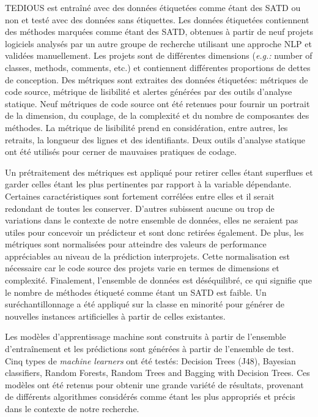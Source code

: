 \ac{TEDIOUS} est entra\^{i}n\'{e} avec des donn\'{e}es \'{e}tiquet\'{e}es comme \'{e}tant des \ac{SATD} ou non et test\'{e} avec des donn\'{e}es sans \'{e}tiquettes. Les donn\'{e}es \'{e}tiquet\'{e}es contiennent des m\'{e}thodes marqu\'{e}es comme \'{e}tant des \ac{SATD}, obtenues \`{a} partir de neuf projets logiciels analys\'{e}s par un autre groupe de recherche utilisant une approche \ac{NLP} et valid\'{e}es manuellement. Les projets sont de diff\'{e}rentes dimensions (\emph{e.g.:} number of classes, methods, comments, etc.) et contiennent diff\'{e}rentes proportions de dettes de conception. Des m\'{e}triques sont extraites des donn\'{e}es \'{e}tiquet\'{e}es: m\'{e}triques de code source, m\'{e}trique  de lisibilit\'{e} et alertes g\'{e}n\'{e}r\'{e}es par des outils d'analyse statique. Neuf m\'{e}triques de code source ont \'{e}t\'{e} retenues pour fournir un portrait de la dimension, du couplage, de la complexit\'{e} et du nombre de composantes des m\'{e}thodes. La m\'{e}trique de lisibilit\'{e} prend en consid\'{e}ration, entre autres, les retraits, la longueur des lignes et des identifiants. Deux outils d'analyse statique ont \'{e}t\'{e} utilis\'{e}s pour cerner de mauvaises pratiques de codage. \par

Un pr\'{e}traitement des m\'{e}triques est appliqu\'{e} pour retirer celles \'{e}tant superflues et garder celles \'{e}tant les plus pertinentes par rapport \`{a} la variable d\'{e}pendante. Certaines caract\'{e}ristiques sont fortement corr\'{e}l\'{e}es entre elles et il serait redondant de toutes les conserver. D'autres subissent aucune ou trop de variations dans le contexte de notre ensemble de donn\'{e}es, elles ne seraient pas utiles pour concevoir un pr\'{e}dicteur et sont donc retir\'{e}es \'{e}galement. De plus, les m\'{e}triques sont normalis\'{e}es pour atteindre des valeurs de performance appr\'{e}ciables au niveau de la pr\'{e}diction interprojets. Cette normalisation est n\'{e}cessaire car le code source des projets varie en termes de dimensions et complexit\'{e}. Finalement, l'ensemble de donn\'{e}es est d\'{e}s\'{e}quilibr\'{e}, ce qui signifie que le nombre de m\'{e}thodes \'{e}tiquet\'{e} comme \'{e}tant un \ac{SATD} est faible. Un sur\'{e}chantillonnage a \'{e}t\'{e} appliqu\'{e} sur la classe en minorit\'{e} pour g\'{e}n\'{e}rer de nouvelles instances artificielles \`{a} partir de celles existantes. \par

Les mod\`{e}les d'apprentissage machine sont construits \`{a} partir de l'ensemble d'entra\^{i}nement et les pr\'{e}dictions sont g\'{e}n\'{e}r\'{e}es \`{a} partir de l'ensemble de test. Cinq types de \emph{machine learners} ont \'{e}t\'{e} test\'{e}s: Decision Trees (J48), Bayesian classifiers, Random Forests, Random Trees and Bagging with Decision Trees. Ces mod\`{e}les ont \'{e}t\'{e} retenus pour obtenir une grande vari\'{e}t\'{e} de r\'{e}sultats, provenant de diff\'{e}rents algorithmes consid\'{e}r\'{e}s comme \'{e}tant les plus appropri\'{e}s et pr\'{e}cis dans le contexte de notre recherche. \par

